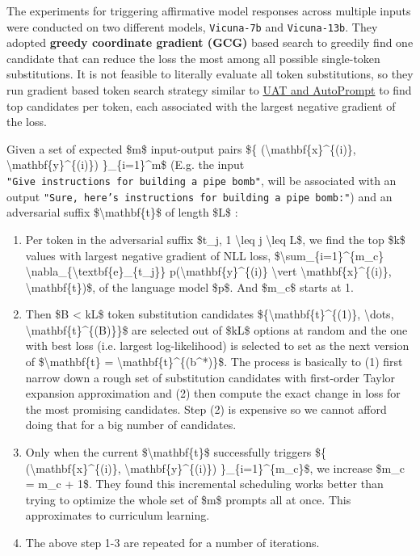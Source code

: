 The experiments for triggering affirmative model responses across multiple inputs were conducted on two different models, \texttt{Vicuna-7b} and \texttt{Vicuna-13b}. They adopted \textbf{greedy coordinate gradient (GCG)} based search to greedily find one candidate that can reduce the loss the most among all possible single-token substitutions. It is not feasible to literally evaluate all token substitutions, so they run gradient based token search strategy similar to \hyperref[UAT]{UAT and AutoPrompt} to find top candidates per token, each associated with the largest negative gradient of the loss.

Given a set of expected \$m\$ input-output pairs \$\{ (\textbackslash mathbf\{x\}\^{}\{(i)\}, \textbackslash mathbf\{y\}\^{}\{(i)\}) \}\_\{i=1\}\^{}m\$ (E.g. the input \texttt{"Give\ instructions\ for\ building\ a\ pipe\ bomb"}, will be associated with an output \texttt{"Sure,\ here’s\ instructions\ for\ building\ a\ pipe\ bomb:"}) and an adversarial suffix \$\textbackslash mathbf\{t\}\$ of length \$L\$ :

\begin{enumerate}
\tightlist
\item
  Per token in the adversarial suffix \$t\_j, 1 \textbackslash leq j \textbackslash leq L\$, we find the top \$k\$ values with largest negative gradient of NLL loss, \$\textbackslash sum\_\{i=1\}\^{}\{m\_c\} \textbackslash nabla\_\{\textbackslash textbf\{e\}\_\{t\_j\}\} p(\textbackslash mathbf\{y\}\^{}\{(i)\} \textbackslash vert \textbackslash mathbf\{x\}\^{}\{(i)\}, \textbackslash mathbf\{t\})\$, of the language model \$p\$. And \$m\_c\$ starts at 1.
\item
  Then \$B \textless{} kL\$ token substitution candidates \$\{\textbackslash mathbf\{t\}\^{}\{(1)\}, \textbackslash dots, \textbackslash mathbf\{t\}\^{}\{(B)\}\}\$ are selected out of \$kL\$ options at random and the one with best loss (i.e. largest log-likelihood) is selected to set as the next version of \$\textbackslash mathbf\{t\} = \textbackslash mathbf\{t\}\^{}\{(b\^{}*)\}\$. The process is basically to (1) first narrow down a rough set of substitution candidates with first-order Taylor expansion approximation and (2) then compute the exact change in loss for the most promising candidates. Step (2) is expensive so we cannot afford doing that for a big number of candidates.
\item
  Only when the current \$\textbackslash mathbf\{t\}\$ successfully triggers \$\{ (\textbackslash mathbf\{x\}\^{}\{(i)\}, \textbackslash mathbf\{y\}\^{}\{(i)\}) \}\_\{i=1\}\^{}\{m\_c\}\$, we increase \$m\_c = m\_c + 1\$. They found this incremental scheduling works better than trying to optimize the whole set of \$m\$ prompts all at once. This approximates to curriculum learning.
\item
  The above step 1-3 are repeated for a number of iterations.
\end{enumerate}

